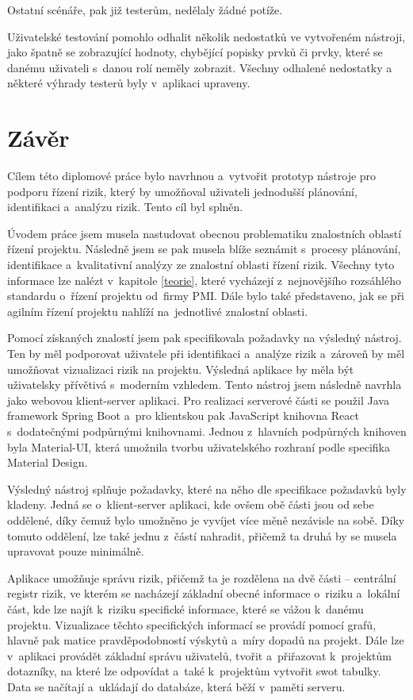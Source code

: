 Ostatní scénáře, pak již testerům, nedělaly žádné potíže. 

Uživatelské testování pomohlo odhalit několik nedostatků ve vytvořeném nástroji, jako špatně se zobrazující hodnoty, chybějící popisky prvků či prvky, které se danému uživateli s~danou rolí neměly zobrazit. Všechny odhalené nedostatky a některé výhrady testerů byly v~aplikaci upraveny.


\chapter{Závěr}
\label{zaver}

Cílem této diplomové práce bylo navrhnou a~vytvořit prototyp nástroje pro podporu řízení rizik, který by umožňoval uživateli jednodušší plánování, identifikaci a~analýzu rizik. Tento cíl byl splněn.

Úvodem práce jsem musela nastudovat obecnou problematiku znalostních oblastí řízení projektu. Následně jsem se pak musela blíže seznámit s~procesy plánování, identifikace a~kvalitativní analýzy ze znalostní oblasti řízení rizik. Všechny tyto informace lze nalézt v~kapitole \ref{teorie}, které vycházejí z~nejnovějšího rozsáhlého standardu o~řízení projektu od~firmy PMI.  Dále bylo také představeno, jak se při agilním řízení projektu nahlíží na~jednotlivé znalostní oblasti.

Pomocí získaných znalostí jsem pak specifikovala požadavky na výsledný nástroj. Ten by měl podporovat uživatele při identifikaci a~analýze rizik a~zároveň by měl umožňovat vizualizaci rizik na projektu. Výsledná aplikace by měla být uživatelsky přívětivá s~moderním vzhledem. Tento nástroj jsem následně navrhla jako webovou klient-server aplikaci. 
Pro realizaci serverové části se použil Java framework Spring Boot a~pro klientskou pak JavaScript knihovna React s~dodatečnými podpůrnými knihovnami. Jednou z~hlavních podpůrných knihoven byla Material-UI, která umožnila tvorbu uživatelského rozhraní podle specifika Material Design.

Výsledný nástroj splňuje požadavky, které na něho dle specifikace požadavků byly kladeny. Jedná se o~klient-server aplikaci, kde ovšem obě části jsou od sebe oddělené, díky čemuž bylo umožněno je vyvíjet více měně nezávisle na sobě. Díky tomuto oddělení, lze také jednu z~částí nahradit, přičemž ta druhá by se musela upravovat pouze minimálně.

Aplikace umožňuje správu rizik, přičemž ta je rozdělena na dvě části – centrální registr rizik, ve kterém se nacházejí základní obecné informace o~riziku a~lokální část, kde lze najít k~riziku specifické informace, které se vážou k~danému projektu. Vizualizace těchto specifických informací se provádí pomocí grafů, hlavně pak matice pravděpodobností výskytů a~míry dopadů na projekt.
Dále lze v~aplikaci provádět základní správu uživatelů, tvořit a~přiřazovat k~projektům dotazníky, na které lze odpovídat a~také k~projektům vytvořit swot tabulky. Data se načítají a~ukládají do databáze, která běží v~paměti serveru.

